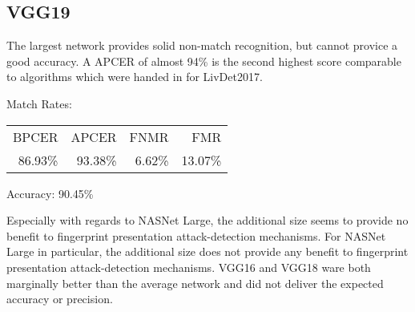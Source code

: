 \subsection{VGG19}
\begin{minipage}[c]{0.7\textwidth}
    The largest network provides solid non-match recognition, but cannot provice a good accuracy.
    A APCER of almost 94\% is the second highest score comparable to algorithms which were handed in for LivDet2017.

    \medskip\centering Match Rates: 
    \begin{tabular}{ r  r  r  r |}
        BPCER       & APCER      & FNMR     & FMR     \\
        86.93\%   & 93.38\%   & 6.62\%   & 13.07\%  \\
    \end{tabular} \hspace{2mm} Accuracy: 90.45\%
\end{minipage}
\hfill
\begin{minipage}[c]{0.3\textwidth}
    \centering
    
\end{minipage}


Especially with regards to NASNet Large, the additional size seems to provide no benefit to fingerprint presentation attack-detection mechanisms.
For NASNet Large in particular, the additional size does not provide any benefit to fingerprint presentation attack-detection mechanisms.
VGG16 and VGG18 ware both marginally better than the average network and did not deliver the expected accuracy or precision.
